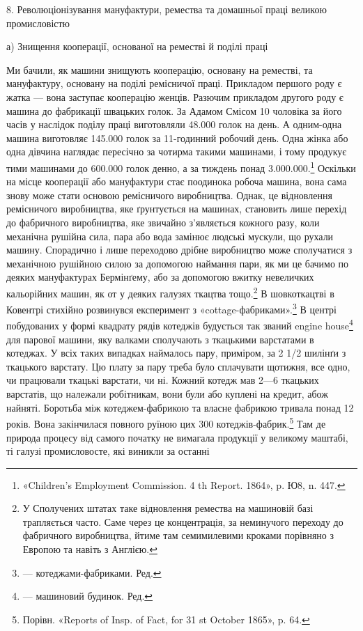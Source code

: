 \parcont{}  %
8. Революціонізування мануфактури, ремества та домашньої
праці великою промисловістю

а) Знищення кооперації, основаної
на реместві й поділі праці

Ми бачили, як машини знищують кооперацію, основану на
реместві, та мануфактуру, основану на поділі ремісничої
праці. Прикладом першого роду є жатка — вона заступає кооперацію
женців. Разючим прикладом другого роду є машина до
фабрикації швацьких голок. За Адамом Смісом 10 чоловіка за
його часів у наслідок поділу праці виготовляли 48.000 голок на
день. А одним-одна машина виготовляє 145.000 голок за 11-годинний
робочий день. Одна жінка або одна дівчина наглядає
пересічно за чотирма такими машинами, і тому продукує тими
машинами до 600.000 голок денно, а за тиждень понад 3.000.000.\footnote{
«Children’s Employment Commission. 4 th Report. 1864», p. Ю8,
n. 447.
}
Оскільки на місце кооперації або мануфактури стає поодинока
робоча машина, вона сама знову може стати основою ремісничого
виробництва. Однак, це відновлення ремісничого виробництва,
яке ґрунтується на машинах, становить лише перехід до фабричного
виробництва, яке звичайно з’являється кожного разу, коли
механічна рушійна сила, пара або вода замінює людські мускули,
що рухали машину. Спорадично і лише переходово дрібне виробництво
може сполучатися з механічною рушійною силою за
допомогою наймання пари, як ми це бачимо по деяких мануфактурах
Бермінґему, або за допомогою вжитку невеличких кальорійних
машин, як от у деяких галузях ткацтва тощо.\footnote{
У Сполучених штатах таке відновлення ремества на машиновій
базі трапляється часто. Саме через це концентрація, за неминучого переходу
до фабричного виробництва, йтиме там семимилевими кроками порівняно
з Европою та навіть з Англією.
} В шовкоткацтві
в Ковентрі стихійно розвинувся експеримент з «cottage-фабриками».\footnote*{
— котеджами-фабриками. Ред.
}
В центрі побудованих у формі квадрату рядів котеджів
будується так званий engine house\footnote*{
— машиновий будинок. Ред.
} для парової машини,
яку валками сполучають з ткацькими варстатами в котеджах.
У всіх таких випадках наймалось пару, приміром, за 2 1/2 шилінґи
з ткацького варстату. Цю плату за пару треба було сплачувати
щотижня, все одно, чи працювали ткацькі варстати, чи ні. Кожний
котедж мав 2—6 ткацьких варстатів, що належали робітникам,
вони були або куплені на кредит, абож найняті. Боротьба між
котеджем-фабрикою та власне фабрикою тривала понад 12 років.
Вона закінчилася повного руїною цих 300 котеджів-фабрик.\footnote{
Порівн. «Reports of Insp. of Fact, for 31 st October 1865», p. 64.
} Там
де природа процесу від самого початку не вимагала продукції у великому
маштабі, ті галузі промисловосте, які виникли за останні
\parbreak{}  %
